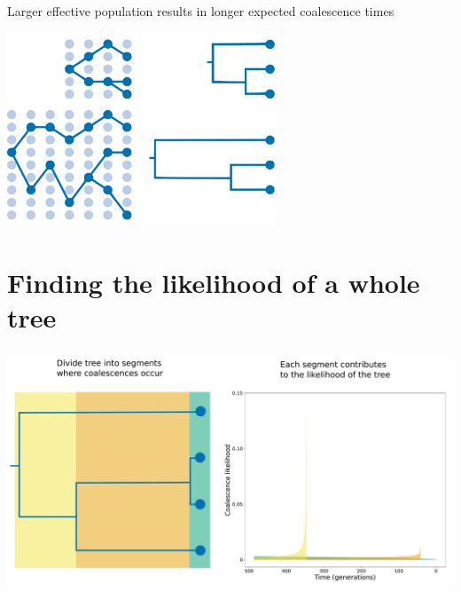 \documentclass[aspectratio=169]{beamer}
\begin{document}
\begin{frame} \frametitle{\insertsection}

    \begin{center}

        Larger effective population results in longer expected coalescence times

        \includegraphics[width=0.6\textwidth]{images/coalescence}

    \end{center}

\end{frame}

\section{Finding the likelihood of a whole tree}

\begin{frame} \frametitle{\insertsection}

    \centering\includegraphics[width=\textwidth]{images/tree-likelihood}


\end{frame}
\end{document}
